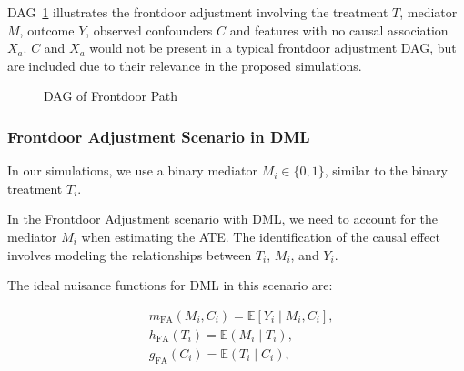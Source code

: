 \documentclass{article}
\numberwithin{equation}{section}
\newenvironment{colorparagraph}[1]{\par\color{#1}}{\par}
\begin{document}
{\begin{colorparagraph}{annotationcolor}
DAG~\ref{fig:dag_frontdoor_path} illustrates the frontdoor adjustment involving the treatment $T$, mediator $M$, outcome $Y$, observed confounders $C$ and features with no causal association $X_a$. $C$ and $X_a$ would not be present in a typical frontdoor adjustment DAG, but are included due to their relevance in the proposed simulations.

\begin{figure}[H]
    \centering
    \caption{DAG of Frontdoor Path}
    \label{fig:dag_frontdoor_path}
\end{figure}

\subsubsection{Frontdoor Adjustment Scenario in DML}

In our simulations, we use a binary mediator $M_i \in \{0, 1\}$, similar to the binary treatment $T_i$.

In the Frontdoor Adjustment scenario with DML, we need to account for the mediator $M_i$ when estimating the ATE. The identification of the causal effect involves modeling the relationships between $T_i$, $M_i$, and $Y_i$.

The ideal nuisance functions for DML in this scenario are:

\begin{align}
    & m_{\text{FA}}(M_i, C_i) = \mathbb{E}[Y_i \mid M_i, C_i],
    \label{eq:m_x_for_target_frontdoor_adjustment} \\
    & h_{\text{FA}}(T_i) = \mathbb{E}(M_i \mid T_i),
    \label{eq:h_x_for_mediator_frontdoor_adjustment} \\
    & g_{\text{FA}}(C_i) = \mathbb{E}(T_i \mid C_i),
    \label{eq:g_x_for_treatment_frontdoor_adjustment}
\end{align}


\end{colorparagraph}}
\end{document}
